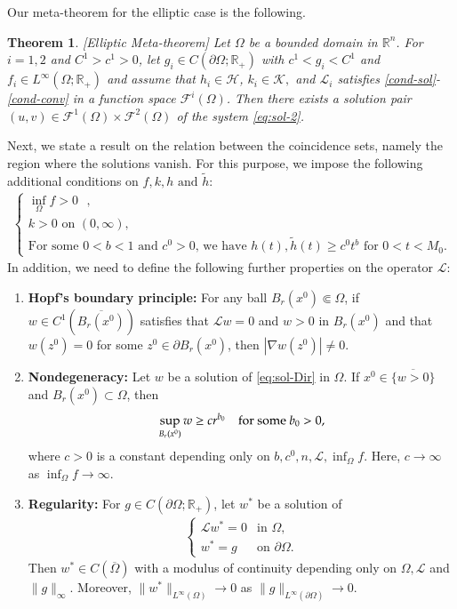 \documentclass[11pt,oneside,english]{amsart}
\newcommand{\R}{{\mathbb R}}
\newcommand{\cL}{{\mathcal L}}
\newcommand{\cF}{{\mathcal F}}
\newcommand{\D}{\nabla}
\numberwithin{equation}{section}
\newtheorem{theorem}{Theorem}
\theoremstyle{plain}
\numberwithin{equation}{section}
\begin{document}
Our meta-theorem for the elliptic case is the following. 


\begin{theorem}\label{thm:meta}[Elliptic Meta-theorem]
    Let $\Omega$ be a bounded domain in $\R^n$. For $i=1,2$ and $C^1>c^1>0$, let $g_i\in C(\partial\Omega;\R_+)$ with $c^1<g_i<C^1$ and $f_i\in L^\infty(\Omega;\R_+)$ and assume that  $h_i \in \mathcal{H}$,  $k_i \in \mathcal{K},$ and $\cL_i$ satisfies \ref{cond-sol}-\ref{cond-conv} in a function space $\cF^i(\Omega)$. Then there exists a solution pair $(u,v)\in \cF^1(\Omega)\times \cF^2(\Omega)$ of the system \eqref{eq:sol-2}.
\end{theorem}



Next, we state a result on the relation between the coincidence sets, namely the region where the solutions vanish. 
For this purpose, we impose the following additional conditions on $f,k, h \text{ and } \tilde h$:
\begin{align}
    \label{eq:rhs-add}
    \begin{cases}
        \text{$\inf_\Omega f>0$  },\\
        \text{$k>0$ on $(0,\infty)$, }\\
        \text{For some $0<b<1$ and $c^0>0$, we have $h(t), \tilde h(t)\ge c^0t^b$ for $0<t<M_0$.   }
    \end{cases}
\end{align}
In addition, we need to  define the following further properties on the operator $\cL$: 
\begin{enumerate}[label={\bf (PE\arabic*')}]
    \item\label{cond-Hopf} {\bf Hopf's boundary principle:} For any ball $B_r(x^0)\Subset \Omega$, if $w\in C^1(\overline{B_r(x^0)})$ satisfies that $\cL w=0$ and $w>0$ in $B_r(x^0)$ and that $w(z^0)=0$ for some $z^0\in \partial B_r(x^0)$, then $|\D w(z^0)|\neq0$.
    \item\label{cond-nondeg}{\bf Nondegeneracy:} Let $w$ be a solution of \eqref{eq:sol-Dir} in $\Omega$. If $x^0\in \overline{\{w>0\}}$ and $B_r(x^0)\subset\Omega$, then
    $$
    \sup_{B_r(x^0)}w\ge cr^{b_0} \quad \hbox{for some } b_0 > 0, 
    $$
    where $c>0$ is a constant depending only on $b,c^0,n,\cL,\inf_\Omega f$. Here, $c\to\infty$ as $\inf_\Omega f\to\infty$.
    

   
    
\item\label{cond-conv-2}{\bf Regularity:} For $g\in C(\partial\Omega;\R_+)$, let $w^*$ be a solution of 
\begin{align*}
    \begin{cases}
        \cL w^*=0&\text{in }\Omega,\\
        w^*=g&\text{on }\partial\Omega.
    \end{cases}
\end{align*}
    Then $w^*\in C(\overline{\Omega})$ with a modulus of continuity depending only on $\Omega,\cL$ and $\|g\|_\infty$. Moreover,  $\|w^*\|_{L^\infty(\Omega)}\to0$ as $\|g\|_{L^\infty(\partial\Omega)}\to0$.
\end{enumerate}
\end{document}
